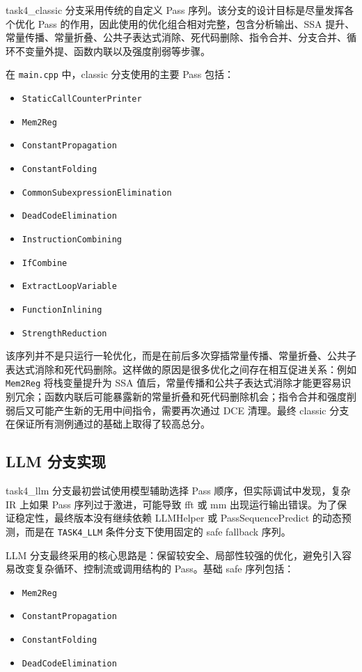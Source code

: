 task4\_classic 分支采用传统的自定义 Pass 序列。该分支的设计目标是尽量发挥各个优化 Pass 的作用，因此使用的优化组合相对完整，包含分析输出、SSA 提升、常量传播、常量折叠、公共子表达式消除、死代码删除、指令合并、分支合并、循环不变量外提、函数内联以及强度削弱等步骤。

在 \texttt{main.cpp} 中，classic 分支使用的主要 Pass 包括：

\begin{itemize}
  \item \texttt{StaticCallCounterPrinter}
  \item \texttt{Mem2Reg}
  \item \texttt{ConstantPropagation}
  \item \texttt{ConstantFolding}
  \item \texttt{CommonSubexpressionElimination}
  \item \texttt{DeadCodeElimination}
  \item \texttt{InstructionCombining}
  \item \texttt{IfCombine}
  \item \texttt{ExtractLoopVariable}
  \item \texttt{FunctionInlining}
  \item \texttt{StrengthReduction}
\end{itemize}

该序列并不是只运行一轮优化，而是在前后多次穿插常量传播、常量折叠、公共子表达式消除和死代码删除。这样做的原因是很多优化之间存在相互促进关系：例如 \texttt{Mem2Reg} 将栈变量提升为 SSA 值后，常量传播和公共子表达式消除才能更容易识别冗余；函数内联后可能暴露新的常量折叠和死代码删除机会；指令合并和强度削弱后又可能产生新的无用中间指令，需要再次通过 DCE 清理。最终 classic 分支在保证所有测例通过的基础上取得了较高总分。

\subsection{LLM 分支实现}

task4\_llm 分支最初尝试使用模型辅助选择 Pass 顺序，但实际调试中发现，复杂 IR 上如果 Pass 序列过于激进，可能导致 fft 或 mm 出现运行输出错误。为了保证稳定性，最终版本没有继续依赖 LLMHelper 或 PassSequencePredict 的动态预测，而是在 \texttt{TASK4\_LLM} 条件分支下使用固定的 safe fallback 序列。

LLM 分支最终采用的核心思路是：保留较安全、局部性较强的优化，避免引入容易改变复杂循环、控制流或调用结构的 Pass。基础 safe 序列包括：

\begin{itemize}
  \item \texttt{Mem2Reg}
  \item \texttt{ConstantPropagation}
  \item \texttt{ConstantFolding}
  \item \texttt{DeadCodeElimination}
\end{itemize}

